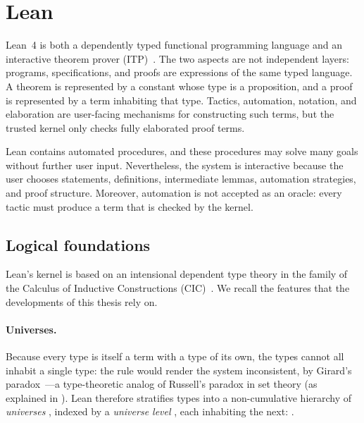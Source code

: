 \providecommand{\Lean}{Lean~4}

\ifdefined\leandefinition\else
\newenvironment{leandefinition}[1]{%
\par\medskip\noindent\textbf{Definition (#1).}\ }{\par\medskip}
\fi
\ifdefined\leanremark\else
\newenvironment{leanremark}[1]{%
\par\medskip\noindent\textbf{Remark (#1).}\ }{\par\medskip}
\fi

\section{Lean}
\label{sec:lean}

\Lean{} is both a dependently typed functional programming language and an
interactive theorem prover (ITP)~\cite{deMouraUllrich2021Lean4,LeanReferenceManual}.  The two aspects are not independent layers:
programs, specifications, and proofs are expressions of the same typed language.
A theorem is represented by a constant whose type is a proposition, and a proof
is represented by a term inhabiting that type.  Tactics, automation, notation,
and elaboration are user-facing mechanisms for constructing such terms, but the
trusted kernel only checks fully elaborated proof terms.

Lean contains automated procedures, and these procedures may solve many goals without further user input.
Nevertheless, the system is interactive because the user chooses statements, definitions, intermediate lemmas, automation strategies, and proof
structure.
Moreover, automation is not accepted as an oracle: every tactic must produce a term that is checked by the kernel.

\subsection{Logical foundations}
\label{subsec:lean-foundations}

Lean's kernel is based on an intensional dependent type theory in the family of
the Calculus of Inductive Constructions (CIC)~\cite{coquandHuet1988coc,coquandPaulin1990cic}.
We recall the features that the developments of this thesis rely on.

\paragraph{Universes.}
Because every type is itself a term with a type of its own, the types cannot all
inhabit a single type: the rule  would render the system
inconsistent, by Girard's paradox~\cite{girard1972}---a type-theoretic analog of
Russell's paradox in set theory (as explained in ).
Lean therefore stratifies types into a non-cumulative hierarchy of \emph{universes}
, indexed by a \emph{universe level} , each inhabiting
the next: .

